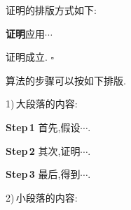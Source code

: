 \documentclass{ctacn}%
\begin{document}
\begin{multicols}{2}











证明的排版方式如下:

\textbf{证明}\quad 应用$\cdots$

证明成立. {\Large$\square$}

算法的步骤可以按如下排版.

1)\,大段落的内容:

\textbf{Step\,1}\quad
首先,假设$\cdots$.

\textbf{Step\,2}\quad
其次,证明$\cdots$.

\textbf{Step\,3}\quad
最后,得到$\cdots$.

2)\,小段落的内容:


\end{multicols}
\end{document}
